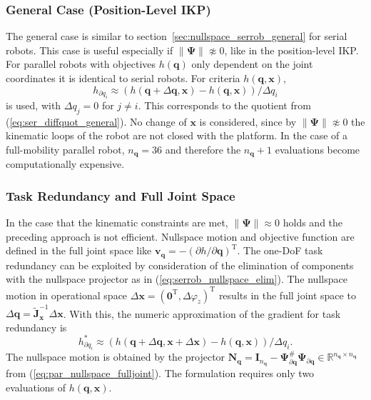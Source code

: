 \documentclass[a4paper,twoside]{article}
\newcommand{\transp}[0]{{\mathrm{T}}}
\begin{document}
\subsubsection{General Case (Position-Level IKP)}
\label{sec:parrob_taskred_general}

The general case is similar to section~\ref{sec:nullspace_serrob_general} for serial robots. 
This case is useful especially if $\lVert\bm{\Psi}\rVert \not\approx 0$, like in the position-level IKP.
For parallel robots with objectives $h(\bm{q})$ only dependent on the joint coordinates it is identical to serial robots.
%
For criteria $h(\bm{q},\bm{x})$, 
\begin{equation}
h_{\partial q_i} \approx (h(\bm{q}+\Delta \bm{q},\bm{x}) - h(\bm{q},\bm{x}))/\Delta q_i
\end{equation}
is used, with $\Delta q_j = 0$ for $j \neq i$.
This corresponds to the quotient from (\ref{eq:ser_diffquot_general}).
No change of $\bm{x}$ is considered, since by $\lVert\bm{\Psi}\rVert \not\approx 0$ the kinematic loops of the robot are not closed with the platform.
In the case of a full-mobility parallel robot, $n_{\bm{q}}=36$ and therefore the $n_{\bm{q}}{+}1$ evaluations become computationally expensive.

\subsubsection{Task Redundancy and Full Joint Space}
\label{sec:parrob_taskred_fullspace}

In the case that the kinematic constraints are met, $\lVert\bm{\Psi}\rVert \approx 0$ holds and the preceding approach is not efficient.
Nullspace motion and objective function are defined in the full joint space like $\bm{v}_{\bm{q}} = -(\partial h / \partial \bm{q})^\transp$.
The one-DoF task redundancy can be exploited by consideration of the elimination of components with the nullspace projector as in (\ref{eq:serrob_nullspace_elim}).
The nullspace motion in operational space $\Delta \bm{x}{=}(\bm{0}^\transp,\Delta  \varphi_z)^\transp$ results in the full joint space to $\Delta \bm{q}=\tilde{\bm{J}}^{-1}_{\bm{x}} \Delta \bm{x}$.
With this, the numeric approximation of the gradient for task redundancy is
\begin{equation}
h_{\partial q_i}^{*} \approx (h(\bm{q}+\Delta \bm{q},\bm{x}+\Delta \bm{x}) - h(\bm{q},\bm{x}))/\Delta q_i.
\label{eq:par_diffquot_taskredfulljoint}
\end{equation}
The nullspace motion is obtained by the projector $\bm{N}_{\bm{q}} = \bm{I}_{n_{\bm{q}}}-\bm{\Psi}_{\partial \bm{q}}^{\#}\bm{\Psi}_{\partial \bm{q}} \in \mathbb{R}^{n_{\bm{q}} \times n_{\bm{q}}}$ from (\ref{eq:par_nullspace_fulljoint}).
The formulation requires only two evaluations of $h(\bm{q},\bm{x})$. %
\end{document}
